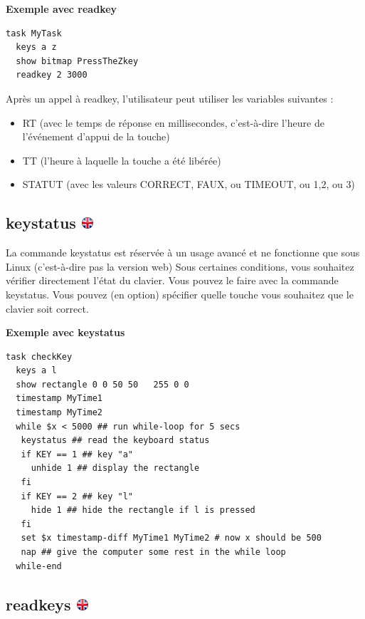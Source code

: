 \documentclass[
]{book}
\providecommand{\tightlist}{%
  \setlength{\itemsep}{0pt}\setlength{\parskip}{0pt}}
\begin{document}
\textbf{Exemple avec readkey}

\begin{verbatim}
task MyTask
  keys a z
  show bitmap PressTheZkey
  readkey 2 3000
\end{verbatim}

Après un appel à readkey, l'utilisateur peut utiliser les variables
suivantes :

\begin{itemize}
\tightlist
\item
  RT (avec le temps de réponse en millisecondes, c'est-à-dire l'heure de
  l'événement d'appui de la touche)
\item
  TT (l'heure à laquelle la touche a été libérée)
\item
  STATUT (avec les valeurs CORRECT, FAUX, ou TIMEOUT, ou 1,2, ou 3)
\end{itemize}

\hypertarget{keystatus}{%
\subsection[keystatus ]{\texorpdfstring{keystatus
\href{https://www.psytoolkit.org/doc3.2.0/syntax.html\#task-keystatus}{\protect\includegraphics{img/ukflag.png}}}{keystatus }}\label{keystatus}}

La commande keystatus est réservée à un usage avancé et ne fonctionne
que sous Linux (c'est-à-dire pas la version web) Sous certaines
conditions, vous souhaitez vérifier directement l'état du clavier. Vous
pouvez le faire avec la commande keystatus. Vous pouvez (en option)
spécifier quelle touche vous souhaitez que le clavier soit correct.

\textbf{Exemple avec keystatus}

\begin{verbatim}
task checkKey
  keys a l
  show rectangle 0 0 50 50   255 0 0
  timestamp MyTime1
  timestamp MyTime2
  while $x < 5000 ## run while-loop for 5 secs
   keystatus ## read the keyboard status
   if KEY == 1 ## key "a"
     unhide 1 ## display the rectangle
   fi
   if KEY == 2 ## key "l"
     hide 1 ## hide the rectangle if l is pressed
   fi
   set $x timestamp-diff MyTime1 MyTime2 # now x should be 500
   nap ## give the computer some rest in the while loop
  while-end
\end{verbatim}

\hypertarget{readkeys}{%
\subsection[readkeys ]{\texorpdfstring{readkeys
\href{https://www.psytoolkit.org/doc3.2.0/syntax.html\#task-readkeys}{\protect\includegraphics{img/ukflag.png}}}{readkeys }}\label{readkeys}}
\end{document}
